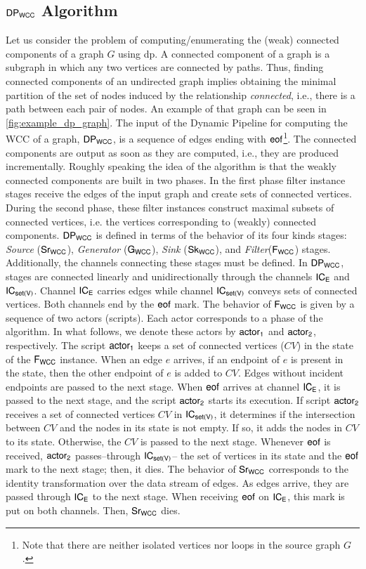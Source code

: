 \iffalse
\subsection{\texorpdfstring{$\mathsf{DP_{WCC}}$}{Lg} Algorithm}\label{sub:sec:wcc:algo}
Let us consider the problem of computing/enumerating the (weak) connected components of a graph $G$ using \acrshort{dp}. 
A connected component of a graph is a subgraph in which any two vertices are connected by paths.  
Thus, finding connected components of an undirected graph implies obtaining the minimal partition of the set of nodes induced by the relationship \textit{connected}, i.e., there is a path between each pair of nodes. 
An example of that graph can be seen in \autoref{fig:example_dp_graph}.
The input of the Dynamic Pipeline for computing the WCC of a graph, $\mathsf{DP_{WCC}}$, is a sequence of edges ending with $\mathsf{eof}$\footnote{Note that there are neither isolated vertices nor loops in the source graph $G$.}. 
The connected components are output as soon as they are computed, i.e., they are produced incrementally. 
Roughly speaking the idea of the algorithm is that the weakly connected components are built in two phases. 
In the first phase filter instance stages receive the edges of the input graph and create sets of connected vertices. 
During the second phase, these filter instances construct maximal subsets of connected vertices, i.e. the vertices corresponding to (weakly) connected components.
%
$\mathsf{DP_{WCC}}$ is defined in terms of the behavior of its four kinds stages: \textit{Source} ($\mathsf{Sr_{WCC}}$),  \textit{Generator} ($\mathsf{G_{WCC}}$),  \textit{Sink} ($\mathsf{Sk_{WCC}}$), and \textit{Filter}($\mathsf{F_{WCC}}$) stages. Additionally,  the channels connecting these stages must be defined. 
In $\mathsf{DP_{WCC}}$, stages are connected linearly and unidirectionally through the channels $\mathsf{IC_E}$ and  $\mathsf{IC_{set(V)}}$. Channel $\mathsf{IC_E}$ carries edges while channel  $\mathsf{IC_{set(V)}}$ conveys sets of connected vertices. Both channels end by the $\mathsf{eof}$ mark. 
The behavior of $\mathsf{F_{WCC}}$ is given by a sequence of two actors (scripts). Each actor corresponds to a phase of the algorithm. In what follows, we denote these actors by $\mathsf{actor_1}$ and $\mathsf{actor_2}$, respectively. 
The script $\mathsf{actor_1}$ keeps a set of connected vertices ($CV$) in the state of the $\mathsf{F_{WCC}}$ instance. When an edge $e$ arrives, if an endpoint of $e$ is present in the state, then the other endpoint of $e$ is added to $CV$. 
Edges without incident endpoints are passed to the next stage. When $\mathsf{eof}$ arrives at channel $\mathsf{IC_E}$, it is passed to the next stage, and the script $\mathsf{actor_2}$ starts its execution. 
If script $\mathsf{actor_2}$ receives a set of connected vertices $CV$ in $\mathsf{IC_{set(V)}}$, it determines if the intersection between $CV$ and the nodes in its state is not empty. If so, it adds the nodes in $CV$  to its state. 
Otherwise, the $CV$ is passed to the next stage. Whenever $\mathsf{eof}$ is received, $\mathsf{actor_2}$ passes--through $\mathsf{IC_{set(V)}}$-- the set of vertices in its state and the $\mathsf{eof}$ mark to the next stage; then, it dies.
The behavior of $\mathsf{Sr_{WCC}}$ corresponds to the identity transformation over the data stream of edges.  As edges arrive, they are passed through  $\mathsf{IC_E}$ to the next stage. When receiving $\mathsf{eof}$ on $\mathsf{IC_E}$, this mark is put on both channels. 
Then, $\mathsf{Sr_{WCC}}$ dies. 

